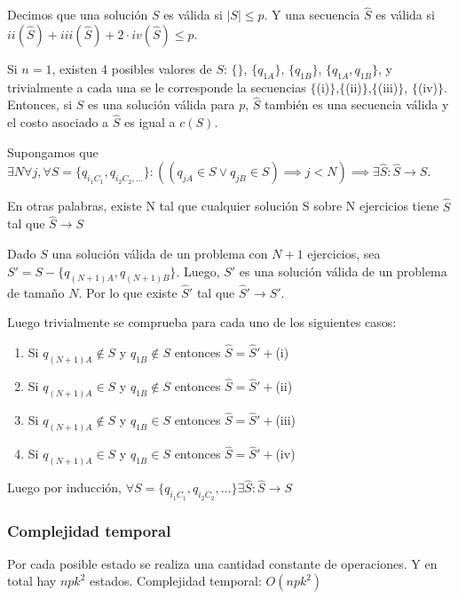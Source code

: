 \documentclass{article}
\begin{document}
Decimos que una solución $S$ es válida si $|S|\leq p$. Y una secuencia $\widehat{S}$ es válida si $ii(\widehat{S}) + iii(\widehat{S}) + 2 \cdot iv(\widehat{S}) \leq p$.

Si $n=1$, existen 4 posibles valores de $S$: $\{\}$, $\{q_{1A}\}$, $\{q_{1B}\}$, $\{q_{1A},q_{1B}\}$, y trivialmente a cada una se le corresponde la secuencias $\{$(i)$\}$,$\{$(ii)$\}$,$\{$(iii)$\}$, $\{$(iv)$\}$. Entonces, si $S$ es una solución válida para $p$, $\widehat{S}$ también es una secuencia válida y el costo asociado a $\widehat{S}$ es igual a $c(S)$.

Supongamos que $\exists N \forall j, \forall S=\{q_{i_1C_1}, q_{i_2C_2,\dots}\}: ((q_{jA} \in S \lor q_{jB} \in S) \implies j<N) \implies \exists \widehat{S} : \widehat{S} \rightarrow S$.

En otras palabras, existe N tal que cualquier solución S sobre N ejercicios tiene $\widehat{S}$ tal que  $\widehat{S}\rightarrow S$

Dado $S$ una solución válida de un problema con $N+1$ ejercicios, sea $S'=S-\{q_{(N+1)A}, q_{(N+1)B}\}$. Luego, $S'$ es una solución válida de un problema de tamaño $N$. Por lo que existe $\widehat{S}'$ tal que $\widehat{S}'\rightarrow S'$.

Luego trivialmente se comprueba para cada uno de los siguientes casos:

\begin{enumerate}
    \item Si $q_{(N+1)A}\not\in S$ y $q_{1B}\not\in S$ entonces $\widehat{S}=\widehat{S}'+$(i)
    \item Si $q_{(N+1)A}\in S$ y $q_{1B}\not\in S$ entonces $\widehat{S}=\widehat{S}'+$(ii)
    \item Si $q_{(N+1)A}\not\in S$ y $q_{1B}\in S$ entonces $\widehat{S}=\widehat{S}'+$(iii)
    \item Si $q_{(N+1)A}\in S$ y $q_{1B}\in S$ entonces $\widehat{S}=\widehat{S}'+$(iv)

\end{enumerate}

Luego por inducción, $\forall S=\{q_{i_1C_1}, q_{i_2C_2},...\}\exists \widehat{S}:\widehat{S}\rightarrow S$

\subsubsection{Complejidad temporal}

Por cada posible estado se realiza una cantidad constante de operaciones. Y en total hay $npk^2$ estados. Complejidad temporal: $O(npk^2)$
\end{document}
